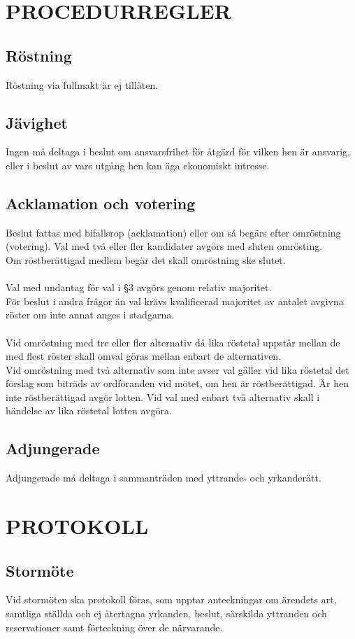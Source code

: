 \documentclass[a4paper]{article}
\begin{document}
{{  \section{PROCEDURREGLER}
  \subsection{Röstning}
  Röstning via fullmakt är ej tillåten.
  \subsection{Jävighet}
  Ingen må deltaga i beslut om ansvarsfrihet för åtgärd för vilken hen är ansvarig, eller i beslut av vars utgång hen kan äga ekonomiskt intresse.
  \subsection{Acklamation och votering}
  Beslut fattas med bifallsrop (acklamation) eller om så begärs efter omröstning (votering). Val med två eller fler kandidater avgörs med sluten omrösting.\\
  Om röstberättigad medlem begär det skall omröstning ske slutet.\\
  \\
  Val med undantag för val i §3 avgörs genom relativ majoritet.\\
  För beslut i andra frågor än val krävs kvalificerad majoritet av antalet avgivna röster om inte annat anges i stadgarna.\\
  \\
  Vid omröstning med tre eller fler alternativ då lika röstetal uppstår mellan de med flest röster skall omval göras mellan enbart de alternativen.\\
  Vid omröstning med två alternativ som inte avser val gäller vid lika röstetal det förslag som biträds av ordföranden vid mötet, om hen är röstberättigad. Är hen inte röstberättigad avgör lotten. Vid val med enbart två alternativ skall i händelse av lika röstetal lotten avgöra. 
  \subsection{Adjungerade}
  Adjungerade må deltaga i sammanträden med yttrande- och yrkanderätt.}
\section{PROTOKOLL}
{\subsection{Stormöte}
  Vid stormöten ska protokoll föras, som upptar anteckningar om ärendets art, samtliga ställda och ej återtagna yrkanden, beslut, särskilda yttranden och reservationer samt förteckning över de närvarande.
}}
\end{document}
